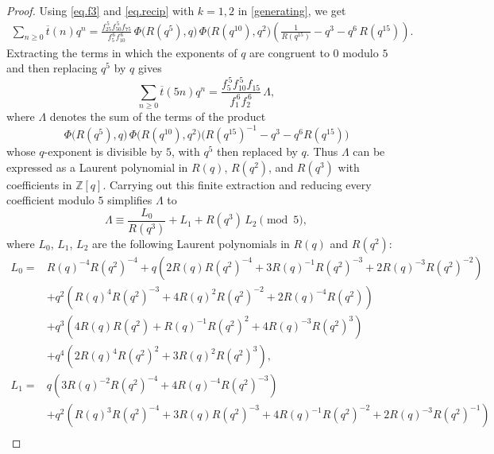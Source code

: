 \documentclass{amsart}
\theoremstyle{definition}
\def\myalpha{R(q)}
\def\mybeta{R(q^2)}
\def\mygamma{R(q^3)}
\newcommand{\tbar}{\overline{t}}
\begin{document}
\begin{proof}
Using \eqref{eq.f3} and \eqref{eq.recip} with $k=1,2$ in \eqref{generating}, we get
\begin{align*}
    \sum_{n\ge0}\tbar(n)q^{n}= \frac{f_{25}^{\,5}f_{50}^{\,5}f_{75}}{f_5^{\,6}f_{10}^{\,6}}\,
\Phi\bigl(R(q^{5}),q\bigr)\,\Phi\bigl(R(q^{10}),q^{2}\bigr)
\left(\frac1{R(q^{15})}-q^{3}-q^{6}\,R(q^{15})\right).
\end{align*}
Extracting the terms in which the exponents of $q$ are congruent to $0$ modulo $5$ and then replacing $q^5$ by $q$ gives
\begin{equation*}
\sum_{n\geq0}\tbar(5n)q^n
=\frac{f_5^{\,5}f_{10}^{\,5}f_{15}}{f_1^{\,6}f_2^{\,6}}\,\Lambda ,
\end{equation*}
where $\Lambda$ denotes the sum of the terms of the product
$$\Phi\bigl(R(q^{5}),q\bigr)\,\Phi\bigl(R(q^{10}),q^{2}\bigr)
\bigl(R(q^{15})^{-1}-q^{3}-q^{6}R(q^{15})\bigr)$$
whose $q$-exponent is divisible by $5$, with $q^{5}$ then replaced by $q$. Thus $\Lambda$
{can be expressed as} a Laurent polynomial in
$R(q)$, $R(q^2)$, and $R(q^3)$
with coefficients in
$\mathbb Z[q]$. Carrying out this finite extraction and reducing every coefficient modulo $5$ simplifies
$\Lambda$ to
\begin{equation*}
\Lambda\equiv \frac{L_0}{\mygamma}+L_1+\mygamma\,L_2\pmod5,
\end{equation*}
where $L_0$, $L_1$, $L_2$ are the following Laurent polynomials in $\myalpha$ and $\mybeta$:
\begin{align*}
L_0={}&\myalpha^{-4}\mybeta^{-4}
+q\!\left(2\myalpha\mybeta^{-4}+3\myalpha^{-1}\mybeta^{-3}+2\myalpha^{-3}\mybeta^{-2}\right) \\
&+q^2\!\left(\myalpha^{4}\mybeta^{-3}+4\myalpha^{2}\mybeta^{-2}+2\myalpha^{-4}\mybeta\right)\\
&+q^3\!\left(4\myalpha\mybeta+\myalpha^{-1}\mybeta^{2}+4\myalpha^{-3}\mybeta^{3}\right) \\
&+q^4\!\left(2\myalpha^{4}\mybeta^{2}+3\myalpha^{2}\mybeta^{3}\right),\\[3pt]
L_1={}&q\!\left(3\myalpha^{-2}\mybeta^{-4}+4\myalpha^{-4}\mybeta^{-3}\right)\\
&+q^2\!\left(\myalpha^{3}\mybeta^{-4}+3\myalpha\mybeta^{-3}+4\myalpha^{-1}\mybeta^{-2}+2\myalpha^{-3}\mybeta^{-1}\right)\\

\end{align*}
\end{proof}
\end{document}
